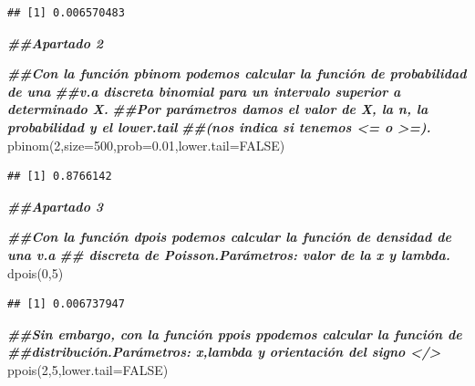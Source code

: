\documentclass[
]{article}
\newenvironment{Shaded}{\begin{snugshade}}{\end{snugshade}}
\newcommand{\AttributeTok}[1]{\textcolor[rgb]{0.77,0.63,0.00}{#1}}
\newcommand{\ConstantTok}[1]{\textcolor[rgb]{0.00,0.00,0.00}{#1}}
\newcommand{\DecValTok}[1]{\textcolor[rgb]{0.00,0.00,0.81}{#1}}
\newcommand{\DocumentationTok}[1]{\textcolor[rgb]{0.56,0.35,0.01}{\textbf{\textit{#1}}}}
\newcommand{\FloatTok}[1]{\textcolor[rgb]{0.00,0.00,0.81}{#1}}
\newcommand{\FunctionTok}[1]{\textcolor[rgb]{0.00,0.00,0.00}{#1}}
\newcommand{\NormalTok}[1]{#1}
\begin{document}
\begin{verbatim}
## [1] 0.006570483
\end{verbatim}

\begin{Shaded}
\begin{Highlighting}[]
\DocumentationTok{\#\#Apartado 2}

\DocumentationTok{\#\#Con la función pbinom podemos calcular la función de probabilidad de una }
\DocumentationTok{\#\#v.a discreta binomial para un intervalo superior a determinado X. }
\DocumentationTok{\#\#Por parámetros damos el valor de X, la n, la probabilidad y el lower.tail}
\DocumentationTok{\#\#(nos indica si tenemos \textless{}= o  \textgreater{}=).}
\FunctionTok{pbinom}\NormalTok{(}\DecValTok{2}\NormalTok{,}\AttributeTok{size=}\DecValTok{500}\NormalTok{,}\AttributeTok{prob=}\FloatTok{0.01}\NormalTok{,}\AttributeTok{lower.tail=}\ConstantTok{FALSE}\NormalTok{)}
\end{Highlighting}
\end{Shaded}

\begin{verbatim}
## [1] 0.8766142
\end{verbatim}

\begin{Shaded}
\begin{Highlighting}[]
\DocumentationTok{\#\#Apartado 3}

\DocumentationTok{\#\#Con la función dpois podemos calcular la función de densidad de una v.a}
\DocumentationTok{\#\# discreta de Poisson.Parámetros: valor de la x y lambda.}
\FunctionTok{dpois}\NormalTok{(}\DecValTok{0}\NormalTok{,}\DecValTok{5}\NormalTok{)}
\end{Highlighting}
\end{Shaded}

\begin{verbatim}
## [1] 0.006737947
\end{verbatim}

\begin{Shaded}
\begin{Highlighting}[]
\DocumentationTok{\#\#Sin embargo, con la función ppois ppodemos calcular la función de }
\DocumentationTok{\#\#distribución.Parámetros: x,lambda y orientación del signo \textless{}/\textgreater{}}
\FunctionTok{ppois}\NormalTok{(}\DecValTok{2}\NormalTok{,}\DecValTok{5}\NormalTok{,}\AttributeTok{lower.tail=}\ConstantTok{FALSE}\NormalTok{)}
\end{Highlighting}
\end{Shaded}
\end{document}
